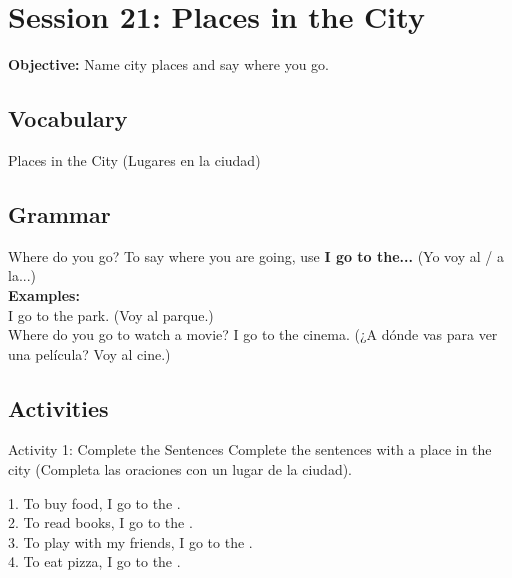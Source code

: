 \section*{Session 21: Places in the City}
\textbf{Objective:} Name city places and say where you go.

\subsection*{Vocabulary}
\begin{vocabcard}{Places in the City (Lugares en la ciudad)}
\end{vocabcard}

\subsection*{Grammar}
\begin{grammartip}{Where do you go?}
  To say where you are going, use \textbf{I go to the...} (Yo voy al / a la...)\\
  \textbf{Examples:}\\
  I go to the park. (Voy al parque.)\\
  Where do you go to watch a movie? I go to the cinema. (¿A dónde vas para ver una película? Voy al cine.)
\end{grammartip}

\subsection*{Activities}

\begin{activity}{Activity 1: Complete the Sentences}
  Complete the sentences with a place in the city (Completa las oraciones con un lugar de la ciudad).
  
  1. To buy food, I go to the \answerline[4cm].\\
  2. To read books, I go to the \answerline[4cm].\\
  3. To play with my friends, I go to the \answerline[4cm].\\
  4. To eat pizza, I go to the \answerline[4cm].
\end{activity}

